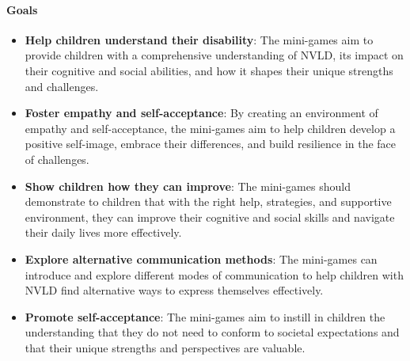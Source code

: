 \paragraph{Goals}
\begin{itemize}
    \item \textbf{Help children understand their disability}: The mini-games aim to provide children with a comprehensive understanding of NVLD, its impact on their cognitive and social abilities, and how it shapes their unique strengths and challenges.
    \item \textbf{Foster empathy and self-acceptance}: By creating an environment of empathy and self-acceptance, the mini-games aim to help children develop a positive self-image, embrace their differences, and build resilience in the face of challenges.
    \item \textbf{Show children how they can improve}: The mini-games should demonstrate to children that with the right help, strategies, and supportive environment, they can improve their cognitive and social skills and navigate their daily lives more effectively.
    \item \textbf{Explore alternative communication methods}: The mini-games can introduce and explore different modes of communication to help children with NVLD find alternative ways to express themselves effectively.
    \item \textbf{Promote self-acceptance}: The mini-games aim to instill in children the understanding that they do not need to conform to societal expectations and that their unique strengths and perspectives are valuable.
\end{itemize}

